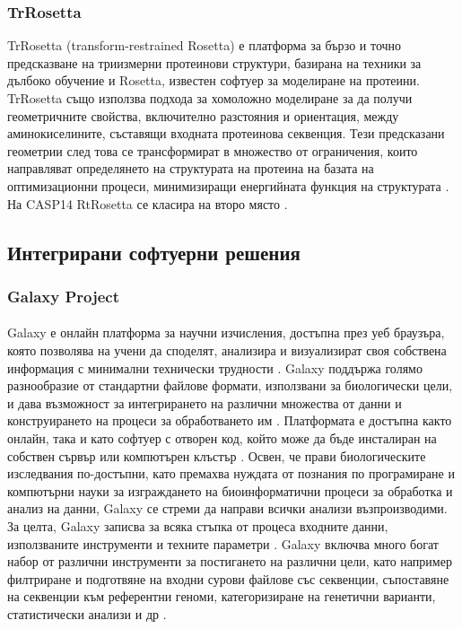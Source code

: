 \documentclass[pdftex,cyrillic,14pt,a4page,twoside,openright]{extreport}
\begin{document}
\subsubsection{TrRosetta}
TrRosetta (transform-restrained Rosetta) е платформа за бързо и точно предсказване на триизмерни протеинови структури, базирана на техники за дълбоко обучение и Rosetta, известен софтуер за моделиране на протеини. TrRosetta също използва подхода за хомоложно моделиране за да получи геометричните свойства, включително разстояния и ориентация, между аминокиселините, съставящи входната протеинова секвенция. Тези предсказани геометрии след това се трансформират в множество от ограничения, които направляват определянето на структурата на протеина на базата на оптимизационни процеси, минимизиращи енергийната функция на структурата \cite{du2021}. На CASP14 RtRosetta се класира на второ място \cite{pereira2021}. 

\subsection{Интегрирани софтуерни решения}

\subsubsection{Galaxy Project}\label{sec:galaxy}
\paragraph{}
Galaxy е онлайн платформа за научни изчисления, достъпна през уеб браузъра, която позволява на учени да споделят, анализира и визуализират своя собствена информация с минимални технически трудности \cite{galaxy2022}. Galaxy поддържа голямо разнообразие от стандартни файлове формати, използвани за биологически цели, и дава възможност за интегрирането на различни множества от данни и конструирането на процеси за обработването им \cite{blankenberg2011}. Платформата е достъпна както онлайн, така и като софтуер с отворен код, който може да бъде инсталиран на собствен сървър или компютърен клъстър \cite{nekrutenko2010}. Освен, че прави биологическите изследвания по-достъпни, като премахва нуждата от познания по програмиране и компютърни науки за изграждането на биоинформатични процеси за обработка и анализ на данни, Galaxy се стреми да направи всички анализи възпроизводими. За целта, Galaxy записва за всяка стъпка от процеса входните данни, използваните инструменти и техните параметри \cite{schatz2010}. Galaxy включва много богат набор от различни инструменти за постигането на различни цели, като например филтриране и подготвяне на входни сурови файлове със секвенции, съпоставяне на секвенции към референтни геноми, категоризиране на генетични варианти, статистически анализи и др \cite{schatz2010}.
\end{document}
